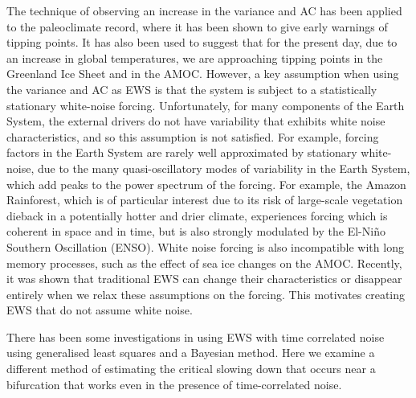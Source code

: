 The technique of observing an increase in the variance and
AC has been applied to the paleoclimate record, where it has been shown to give early
warnings of tipping points\cite{Boers2018a}. It has also been used to 
suggest that for the present day, due to an increase in global temperatures, we are approaching tipping points in 
the Greenland Ice Sheet\cite{Boers2021} and in the AMOC\cite{Boers2021a}.	
However, a key assumption when using the variance and AC as EWS is that the system is subject to a statistically stationary white-noise forcing. Unfortunately, for many
components of the Earth System, the external drivers do not have variability that exhibits white noise characteristics, and
so this assumption is not satisfied. For example, forcing factors in the Earth System are rarely well approximated by stationary white-noise, due to the many quasi-oscillatory modes
of variability in the Earth System\cite{VonderHeydt2021}, which add peaks
to the power spectrum of the forcing. For example, the Amazon
Rainforest, which is of particular interest due to its risk of large-scale vegetation dieback in a potentially hotter and drier
climate, experiences
forcing which is coherent in space and in time, but is also strongly modulated by the
El-Ni\~{n}o Southern Oscillation (ENSO)\cite{Jimenez-Munoz2016}.
White noise forcing is also incompatible with
long memory processes\cite{Hurst1957}, such as the effect of sea ice changes on the AMOC\cite{Kuehn2021}. Recently, it was shown\cite{Kuehn2021}
that traditional EWS  can change their characteristics or disappear entirely when we relax these assumptions on the forcing. This motivates creating EWS that do not assume white noise.


There has been some investigations in using EWS with time correlated noise using generalised least
squares\cite{Boers2021a,Boettner2022} and a Bayesian method\cite{hessler2022,Hessler2022b}. Here we examine a different method of
estimating the critical slowing down that occurs near a bifurcation that works even in the presence of time-correlated noise.

